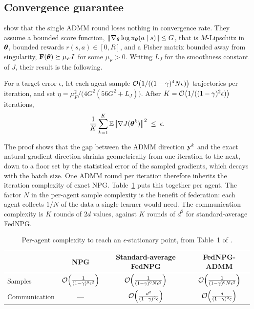 \subsection{Convergence guarantee}

\citet{lan2023fednpgadmm} show that the single ADMM round loses nothing in
convergence rate. They assume a bounded score function,
$\|\nabla_{\boldsymbol{\theta}}\log\pi_{\boldsymbol{\theta}}(a\mid s)\| \le G$, that is $M$-Lipschitz in
$\boldsymbol{\theta}$, bounded rewards $r(s,a) \in [0, R]$, and a Fisher matrix bounded
away from singularity, $\mathbf{F}(\boldsymbol{\theta}) \succeq \mu_F I$ for some $\mu_F > 0$.
Writing $L_J$ for the smoothness constant of $J$, their result is the
following.

\begin{theorem}
\label{thm:conv}
For a target error $\epsilon$, let each agent sample
$\mathcal{O}\big(1/((1-\gamma)^4 N\epsilon)\big)$ trajectories per iteration, and set
$\eta = \mu_F^2 / \big(4G^2(56G^2 + L_J)\big)$. After
$K = \mathcal{O}\big(1/((1-\gamma)^2\epsilon)\big)$ iterations,
\begin{equation}
  \frac{1}{K}\sum_{k=1}^{K} \mathbb{E}\big\|\nabla J(\boldsymbol{\theta}^k)\big\|^2 \;\le\; \epsilon .
\end{equation}
\end{theorem}

The proof shows that the gap between the ADMM direction $\mathbf{y}^k$ and the exact
natural-gradient direction shrinks geometrically from one iteration to the
next, down to a floor set by the statistical error of the sampled gradients,
which decays with the batch size. One ADMM round per iteration therefore
inherits the iteration complexity of exact NPG. Table~\ref{tab:complexity}
puts this together per agent. The factor $N$ in the per-agent sample
complexity is the benefit of federation: each agent collects $1/N$ of the
data a single learner would need. The communication complexity is $K$ rounds
of $2d$ values, against $K$ rounds of $d^2$ for standard-average FedNPG.

\begin{table}[t]
  \centering
  \caption{Per-agent complexity to reach an $\epsilon$-stationary point, from
  Table~1 of \citet{lan2023fednpgadmm}.}
  \label{tab:complexity}
  \begin{tabular}{lccc}
    \toprule
     & NPG & Standard-average FedNPG & FedNPG-ADMM \\
    \midrule
    Samples
      & $\mathcal{O}\!\left(\frac{1}{(1-\gamma)^6\epsilon^2}\right)$
      & $\mathcal{O}\!\left(\frac{1}{(1-\gamma)^6 N\epsilon^2}\right)$
      & $\mathcal{O}\!\left(\frac{1}{(1-\gamma)^6 N\epsilon^2}\right)$ \\[6pt]
    Communication
      & ---
      & $\mathcal{O}\!\left(\frac{d^2}{(1-\gamma)^2\epsilon}\right)$
      & $\mathcal{O}\!\left(\frac{d}{(1-\gamma)^2\epsilon}\right)$ \\
    \bottomrule
  \end{tabular}
\end{table}

